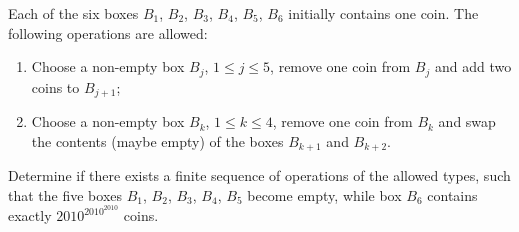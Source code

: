 Each of the six boxes $B_1$,  $B_2$,  $B_3$,  $B_4$,  $B_5$,  $B_6$ initially contains one coin. The following operations are allowed:

\begin{enumerate}[label = \textbf{Type \arabic*:}]
	\item Choose a non-empty box $B_j$,  $1\leq j \leq 5$,  remove one coin from $B_j$ and add two coins to $B_{j+1}$;
	\item Choose a non-empty box $B_k$,  $1\leq k \leq 4$,  remove one coin from $B_k$ and swap the contents (maybe empty) of the boxes $B_{k+1}$ and $B_{k+2}$.
\end{enumerate}

Determine if there exists a finite sequence of operations of the allowed types, such that the five boxes $B_1$,  $B_2$,  $B_3$,  $B_4$,  $B_5$ become empty, while box $B_6$ contains exactly $2010^{2010^{2010}}$ coins.
